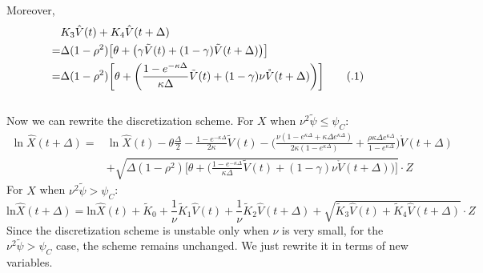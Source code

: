 \documentclass{ws-ijfe}
\newcommand\numberthis{\addtocounter{equation}{1}\tag{\theequation}}
\begin{document}
Moreover,
\begin{align*}
&K_3\hat{V}(t)+K_4\hat{V}(t+\Delta)\\
=&\Delta(1-\rho^2)\big[\theta+\big(\gamma\tilde{V}(t)+(1-\gamma)\tilde{V}(t+\Delta)\big)\big]\\
=&\Delta(1-\rho^2)\bigg[\theta+\bigg(\frac{1-e^{-\kappa\Delta}}{\kappa\Delta}\tilde{V}(t)+(1-\gamma)\nu \mathring{V}(t+\Delta)\bigg)\bigg]\numberthis\label{QEK3K4}
\end{align*}
\\
Now we can rewrite the discretization scheme.
For $X$ when $\nu^2\tilde{\psi} \leq \psi_C $:
\begin{equation}\label{newLnX}
\begin{split}
  \ln\hat{X}(t+\Delta)=&\ln\hat{X}(t)-\theta\frac{\Delta}{2}-\frac{1-e^{-\kappa\Delta}}{2\kappa}\tilde{V}(t)-\bigg(\frac{\nu(1-e^{\kappa\Delta}+\kappa\Delta e^{\kappa\Delta})}{2\kappa(1-e^{\kappa\Delta})}+\frac{\rho\kappa\Delta e^{\kappa\Delta}}{1-e^{\kappa\Delta}}\bigg)\mathring{V}(t+\Delta)\\
  &+\sqrt{\Delta(1-\rho^2)\bigg[\theta+\bigg(\frac{1-e^{-\kappa\Delta}}{\kappa\Delta}\tilde{V}(t)+(1-\gamma)\nu \mathring{V}(t+\Delta)\bigg)\bigg]}\cdot Z
\end{split}
\end{equation}
For $X$ when $\nu^2\tilde{\psi} > \psi_C $:
\begin{equation}\label{newLnX2}
  \text{ln}\hat{X}(t+\Delta)=\text{ln}\hat{X}(t)+\tilde{K}_0+\frac{1}{\nu}\tilde{K}_1\hat{V}(t)+\frac{1}{\nu}\tilde{K}_2\hat{V}(t+\Delta)+\sqrt{\tilde{K}_3\hat{V}(t)+\tilde{K}_4\hat{V}(t+\Delta)}\cdot Z
\end{equation}
Since the discretization scheme is unstable only when $\nu$ is very small, for the $\nu^2\tilde{\psi} > \psi_C $ case, the scheme remains unchanged. We just rewrite it in terms of new variables.
\end{document}
